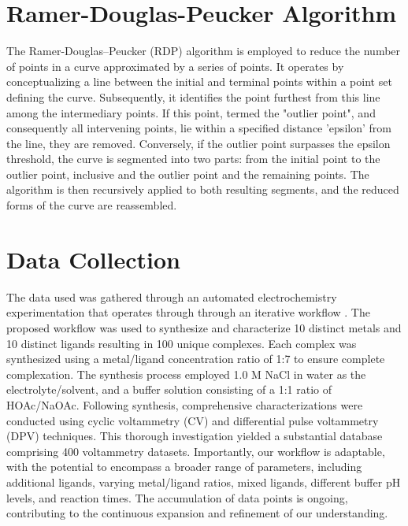\section{Ramer-Douglas-Peucker Algorithm}
The Ramer-Douglas–Peucker (RDP) algorithm is employed to reduce the number of points in a curve approximated by a series of points. It operates by conceptualizing a line between the initial and terminal points within a point set defining the curve. Subsequently, it identifies the point furthest from this line among the intermediary points. If this point, termed the "outlier point", and consequently all intervening points, lie within a specified distance 'epsilon' from the line, they are removed. Conversely, if the outlier point surpasses the epsilon threshold, the curve is segmented into two parts: from the initial point to the outlier point, inclusive and the outlier point and the remaining points. The algorithm is then recursively applied to both resulting segments, and the reduced forms of the curve are reassembled.
\section{Data Collection}
The data used was gathered through an automated electrochemistry experimentation that operates through through an iterative workflow \cite{PabloGarca2024}. The proposed workflow was used to synthesize and characterize 10 distinct metals and 10 distinct ligands resulting in 100 unique complexes. Each complex was synthesized using a metal/ligand concentration ratio of 1:7 to ensure complete complexation. The synthesis process employed 1.0 M NaCl in water as the electrolyte/solvent, and a buffer solution consisting of a 1:1 ratio of HOAc/NaOAc. Following synthesis, comprehensive characterizations were conducted using cyclic voltammetry (CV) and differential pulse voltammetry (DPV) techniques. This thorough investigation yielded a substantial database comprising 400 voltammetry datasets. Importantly, our workflow is adaptable, with the potential to encompass a broader range of parameters, including additional ligands, varying metal/ligand ratios, mixed ligands, different buffer pH levels, and reaction times. The accumulation of data points is ongoing, contributing to the continuous expansion and refinement of our understanding.
